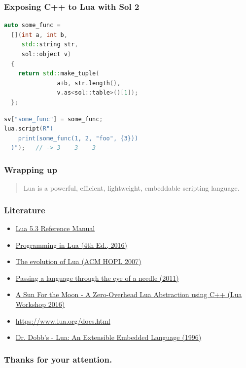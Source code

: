 \documentclass{beamer}
\newif\iftransitions
\begin{document}
\begin{frame}[fragile]
  \frametitle{Exposing C++ to Lua with Sol 2}

  \begin{lstlisting}[language={C++}]
auto some_func =
  [](int a, int b,
     std::string str,
     sol::object v)
  {
    return std::make_tuple(
               a+b, str.length(),
               v.as<sol::table>()[1]);
  };
  \end{lstlisting}
  \iftransitions \pause \fi

  \begin{lstlisting}[language={C++}]
sv["some_func"] = some_func;
lua.script(R"(
    print(some_func(1, 2, "foo", {3}))
  )");   // -> 3    3    3  
  \end{lstlisting}
\end{frame}


\begin{frame}
  \frametitle{Wrapping up}

  \begin{quote}Lua is a powerful, efficient, lightweight, embeddable scripting language.\end{quote}
\end{frame}

\begin{frame}
  \frametitle{Literature}

  \begin{itemize}
  \item \href{https://www.lua.org/manual/5.3/}{Lua 5.3 Reference Manual}
  \item \href{https://www.lua.org/pil/}{Programming in Lua (4th Ed., 2016)}
  \item \href{https://www.lua.org/doc/hopl.pdf}{The evolution of Lua (ACM HOPL 2007)}
  \item \href{https://dl.acm.org/citation.cfm?id=1983083}{Passing a language through the eye of a needle (2011)}
  \item \href{https://www.lua.org/wshop16.html\#ThePhD}{A Sun For the Moon - A Zero-Overhead Lua Abstraction using C++ (Lua Workshop 2016)}
  \item \href{https://www.lua.org/docs.html}{https://www.lua.org/docs.html}
  \end{itemize}

  \begin{itemize}
  \item \href{http://www.drdobbs.com/open-source/lua-an-extensible-embedded-language/184410014}{Dr. Dobb's - Lua: An Extensible Embedded Language (1996)}
  \end{itemize}
\end{frame}

\begin{frame}
  \frametitle{Thanks for your attention.}
\end{frame}
\end{document}
